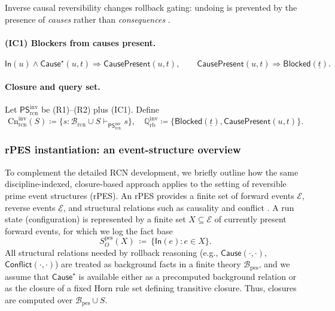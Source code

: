 \documentclass[twoside]{article}
\newcommand{\Cn}{\mathrm{Cn}}
\newcommand{\1}{\mathbf{1}}
\begin{document}
Inverse causal reversibility changes rollback gating: undoing is prevented by the presence of \emph{causes}
rather than \emph{consequences} \cite{melgratti2024reversible}.

\paragraph{(IC1) Blockers from causes present.}
\[
\mathsf{In}(u)\wedge \mathsf{Cause}^\star(u,t)\Rightarrow \mathsf{CausePresent}(u,t),
\qquad
\mathsf{CausePresent}(u,t)\Rightarrow \mathsf{Blocked}(\underline{t}).
\]

\paragraph{Closure and query set.}
Let \(\mathsf{PS}^{\mathrm{inv}}_{\mathrm{rcn}}\) be (R1)--(R2) plus (IC1).
Define
\[
\Cn^{\mathrm{inv}}_{\mathrm{rcn}}(S)\coloneqq \{s:\mathcal{B}_{\mathrm{rcn}}\cup S\vdash_{\mathsf{PS}^{\mathrm{inv}}_{\mathrm{rcn}}} s\},
\quad
\mathbb{Q}^{\mathrm{inv}}_{\mathrm{rb}}\coloneqq \{\mathsf{Blocked}(\underline{t}),\mathsf{CausePresent}(u,t)\}.
\]

\subsubsection{rPES instantiation: an event-structure overview}
\label{sec:rpes-instantiation}

To complement the detailed RCN development, we briefly outline how the same discipline-indexed, closure-based approach applies to the setting of reversible prime event structures (rPES).
An rPES provides a finite set of forward events \(\mathcal{E}\), reverse events \(\underline{\mathcal{E}}\), and structural relations such as causality and conflict \cite{melgratti2024reversible}.
A run state (configuration) is represented by a finite set \(X\subseteq \mathcal{E}\) of currently present forward events, for which we log the fact base
\[
S_O^{\mathrm{pes}}(X)\ \coloneqq\ \{\mathsf{In}(e): e\in X\}.
\]
All structural relations needed by rollback reasoning (e.g., \(\mathsf{Cause}(\cdot,\cdot)\), \(\mathsf{Conflict}(\cdot,\cdot)\))
are treated as background facts in a finite theory \(\mathcal{B}_{\mathrm{pes}}\), and we assume that
\(\mathsf{Cause}^\star\) is available either as a precomputed background relation or as the closure of a fixed Horn rule set
defining transitive closure. Thus, closures are computed over \(\mathcal{B}_{\mathrm{pes}}\cup S\).
\end{document}
